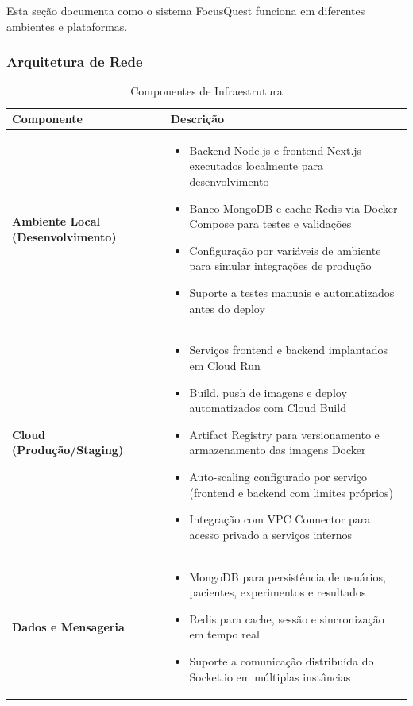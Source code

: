 \documentclass[11pt,a4paper]{article}
\begin{document}
Esta seção documenta como o sistema FocusQuest funciona em diferentes ambientes e plataformas.

\subsubsection{Arquitetura de Rede}

\begin{table}[H]
\centering
\caption{Componentes de Infraestrutura}
\label{tab:infrastructure}
\begin{tabular}{|l|p{10cm}|}
\hline
\textbf{Componente} & \textbf{Descrição} \\
\hline
\textbf{Ambiente Local (Desenvolvimento)} & 
\begin{itemize}[leftmargin=*, nosep]
    \item Backend Node.js e frontend Next.js executados localmente para desenvolvimento
    \item Banco MongoDB e cache Redis via Docker Compose para testes e validações
    \item Configuração por variáveis de ambiente para simular integrações de produção
    \item Suporte a testes manuais e automatizados antes do deploy
\end{itemize} \\
\hline
\textbf{Cloud (Produção/Staging)} & 
\begin{itemize}[leftmargin=*, nosep]
    \item Serviços frontend e backend implantados em Cloud Run
    \item Build, push de imagens e deploy automatizados com Cloud Build
    \item Artifact Registry para versionamento e armazenamento das imagens Docker
    \item Auto-scaling configurado por serviço (frontend e backend com limites próprios)
    \item Integração com VPC Connector para acesso privado a serviços internos
\end{itemize} \\
\hline
\textbf{Dados e Mensageria} & 
\begin{itemize}[leftmargin=*, nosep]
    \item MongoDB para persistência de usuários, pacientes, experimentos e resultados
    \item Redis para cache, sessão e sincronização em tempo real
    \item Suporte a comunicação distribuída do Socket.io em múltiplas instâncias

\end{itemize}
\end{tabular}
\end{table}
\end{document}
